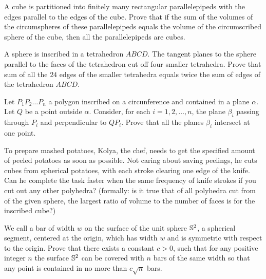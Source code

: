 \documentclass[12pt,a4paper]{memoir}
\theoremstyle{definition}
\begin{document}
\begin{question}[name={1995 Romania TST}]
	A cube is partitioned into finitely many rectangular parallelepipeds with the edges parallel to the edges of the cube. Prove that if the sum of the volumes of the circumspheres of these parallelepipeds equals the volume of the circumscribed sphere of the cube, then all the parallelepipeds are cubes.
\end{question}


\begin{question}[name={1998 Czech and Slovak}]
	A sphere is inscribed in a tetrahedron $ABCD$. The tangent planes to the sphere parallel to the faces of the tetrahedron cut off four smaller tetrahedra. Prove that sum of all the $24$ edges of the smaller tetrahedra equals twice the sum of edges of the tetrahedron $ABCD$.
\end{question}




\begin{question}[name={1993 Brazil}]
	Let $P_1P_2 \dots P_n$ a polygon inscribed on a circunference and contained in a plane $\alpha$. Let $Q$ be a point outside $\alpha$. Consider, for each $i=1,2, \dots ,n$, the plane $\beta_i$ passing through $P_i$ and perpendicular to $QP_i$. Prove that all the planes $\beta_i$ intersect at one point.
\end{question}




\begin{question}[name={2015 Kurchatov Olympiad}]
	To prepare mashed potatoes, Kolya, the chef, needs to get the specified amount of peeled potatoes as soon as possible. Not caring about saving peelings, he cuts cubes from spherical potatoes, with each stroke clearing one edge of the knife. Can he complete the task faster when the same frequency of knife strokes if you cut out any other polyhedra? (formally: is it true that of all polyhedra cut from of the given sphere, the largest ratio of volume to the number of faces is for the inscribed cube?)
\end{question}





\begin{question}[name={2015 Miklos Schweitzer}]
	We call a bar of width ${w}$ on the surface of the unit sphere ${\Bbb{S}^2}$, a spherical segment, centered at the origin, which has width ${w}$ and is symmetric with respect to the origin.
	Prove that there exists a constant ${c>0}$, such that for any positive integer ${n}$ the surface ${\Bbb{S}^2}$ can be covered with ${n}$ bars of the same width so that any point is contained in no more than ${c\sqrt{n}}$ bars.
\end{question}
\end{document}
